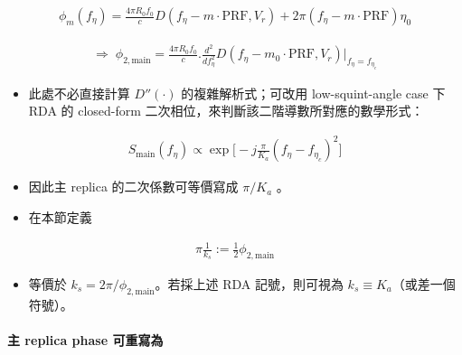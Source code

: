 \documentclass[11pt]{article}
\providecommand{\tightlist}{%
  \setlength{\itemsep}{0pt}\setlength{\parskip}{0pt}}
\begin{document}
\begin{equation}
\begin{aligned}
\phi_m(f_\eta)=\frac{4\pi R_0f_0}{c}D(f_\eta-m\cdot\mathrm{PRF},V_r)+2\pi(f_\eta-m\cdot\mathrm{PRF})\eta_0
\end{aligned}
\end{equation}

\begin{equation}
\begin{aligned}
\Rightarrow\;
\phi_{2,\mathrm{main}} =
\frac{4\pi R_0f_0}{c}
\biggl.
\frac{d^2}{df_\eta^2}D(f_\eta-m_0\cdot\mathrm{PRF},V_r)
\biggr|_{f_\eta=f_{\eta_c}}
\end{aligned}
\end{equation}

\begin{itemize}
\tightlist
\item
  此處不必直接計算 \(D''(\cdot)\) 的複雜解析式；可改用 low-squint-angle
  case 下 RDA 的 closed-form
  二次相位，來判斷該二階導數所對應的數學形式：
\end{itemize}

\begin{equation}
\begin{aligned}
S_{\mathrm{main}}(f_\eta)\propto
\exp\biggl[-j\frac{\pi}{K_a}(f_\eta-f_{\eta_c})^2\biggr]
\end{aligned}
\end{equation}

\begin{itemize}
\item
  因此主 replica 的二次係數可等價寫成 \(\pi/K_a\) 。
\item
  在本節定義
\end{itemize}

\begin{equation}
\begin{aligned}
\pi\frac{1}{k_s}:=\frac{1}{2}\phi_{2,\mathrm{main}}
\end{aligned}
\end{equation}

\begin{itemize}
\tightlist
\item
  等價於 \(k_s=2\pi/\phi_{2,\mathrm{main}}\)。若採上述 RDA
  記號，則可視為 \(k_s\equiv K_a\)（或差一個符號）。
\end{itemize}

\hypertarget{ux4e3b-replica-phase-ux53efux91cdux5bebux70ba}{%
\paragraph{主 replica phase
可重寫為}\label{ux4e3b-replica-phase-ux53efux91cdux5bebux70ba}}
\end{document}
